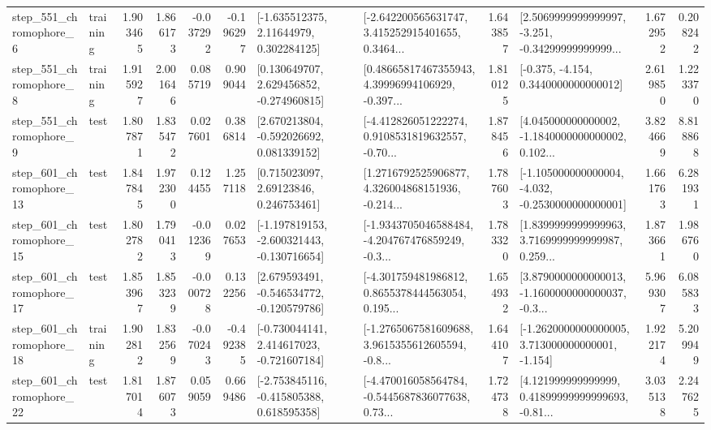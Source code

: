 \begin{tabular}{llrrrrllrlrr}
   step\_551\_chromophore\_6 &  training &      1.903465 &    1.866173 &     -0.037292 & -0.196297 &     [-1.635512375, 2.11644979, 0.302284125] &  [-2.642200565631747, 3.415252915401655, 0.3464... &       1.643857 &  [2.5069999999999997, -3.251, -0.34299999999999... &            1.672952 &          0.208242 \\
   step\_551\_chromophore\_8 &  training &      1.915927 &    2.001646 &      0.085719 &  0.909044 &    [0.130649707, 2.629456852, -0.274960815] &  [0.48665817467355943, 4.39996994106929, -0.397... &       1.810125 &               [-0.375, -4.154, 0.3440000000000012] &            2.619850 &          1.223370 \\
   step\_551\_chromophore\_9 &      test &      1.807871 &    1.835472 &      0.027601 &  0.386814 &    [2.670213804, -0.592026692, 0.081339152] &  [-4.412826051222274, 0.9108531819632557, -0.70... &       1.878456 &  [4.045000000000002, -1.1840000000000002, 0.102... &            3.824669 &          8.818868 \\
  step\_601\_chromophore\_13 &      test &      1.847845 &    1.972300 &      0.124455 &  1.257118 &      [0.715023097, 2.69123846, 0.246753461] &  [1.2716792525906877, 4.326004868151936, -0.214... &       1.787603 &  [-1.105000000000004, -4.032, -0.2530000000000001] &            1.661763 &          6.281931 \\
  step\_601\_chromophore\_15 &      test &      1.802782 &    1.790413 &     -0.012369 &  0.027653 &  [-1.197819153, -2.600321443, -0.130716654] &  [-1.9343705046588484, -4.204767476859249, -0.3... &       1.783320 &  [1.8399999999999963, 3.7169999999999987, 0.259... &            1.873661 &          1.986760 \\
  step\_601\_chromophore\_17 &      test &      1.853967 &    1.853239 &     -0.000728 &  0.132256 &   [2.679593491, -0.546534772, -0.120579786] &  [-4.301759481986812, 0.8655378444563054, 0.195... &       1.654932 &  [3.8790000000000013, -1.1600000000000037, -0.3... &            5.969307 &          6.085833 \\
  step\_601\_chromophore\_18 &  training &      1.902812 &    1.832569 &     -0.070243 & -0.492385 &   [-0.730044141, 2.414617023, -0.721607184] &  [-1.2765067581609688, 3.9615355612605594, -0.8... &       1.644107 &   [-1.2620000000000005, 3.713000000000001, -1.154] &            1.922174 &          5.209949 \\
  step\_601\_chromophore\_22 &      test &      1.817014 &    1.876073 &      0.059059 &  0.669486 &   [-2.753845116, -0.415805388, 0.618595358] &  [-4.470016058564784, -0.5445687836077638, 0.73... &       1.724738 &  [4.121999999999999, 0.41899999999999693, -0.81... &            3.035138 &          2.247625 \\

\end{tabular}
